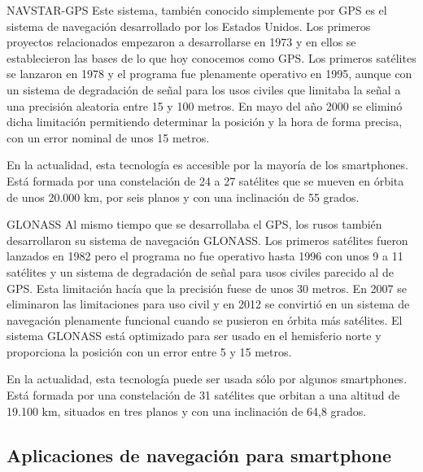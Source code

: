 \begin{definitionlist}
  \item[\acf{NAVSTAR-GPS}] Este sistema, también conocido simplemente por \acs{GPS} es el sistema
    de navegación desarrollado por los Estados Unidos. Los primeros proyectos relacionados empezaron
    a desarrollarse en 1973 y en ellos se establecieron las bases de lo que hoy conocemos como
    \acs{GPS}. Los primeros satélites se lanzaron en 1978 y el programa fue plenamente operativo en
    1995, aunque con un sistema de degradación de señal para los usos civiles que limitaba la señal
    a una precisión aleatoria entre 15 y 100 metros. En mayo del año 2000 se eliminó dicha
    limitación permitiendo determinar la posición y la hora de forma precisa, con un error nominal
    de unos 15 metros.

    En la actualidad, esta tecnología es accesible por la mayoría de los smartphones. Está formada
    por una constelación de 24 a 27 satélites que se mueven en órbita de unos 20.000 km, por seis
    planos y con una inclinación de 55 grados.

  \item[GLONASS] Al mismo tiempo que se desarrollaba el \acs{GPS}, los rusos también desarrollaron
    su sistema de navegación \acs{GLONASS}. Los primeros satélites fueron lanzados en 1982 pero el
    programa no fue operativo hasta 1996 con unos 9 a 11 satélites y un sistema de degradación de
    señal para usos civiles parecido al de \acs{GPS}. Esta limitación hacía que la precisión fuese
    de unos 30 metros. En 2007 se eliminaron las limitaciones para uso civil y en 2012 se convirtió
    en un sistema de navegación plenamente funcional cuando se pusieron en órbita más satélites. El
    sistema \acs{GLONASS} está optimizado para ser usado en el hemisferio norte y proporciona la
    posición con un error entre 5 y 15 metros.

    En la actualidad, esta tecnología puede ser usada sólo por algunos smartphones. Está formada por
    una constelación de 31 satélites que orbitan a una altitud de 19.100 km, situados en tres planos
    y con una inclinación de 64,8 grados.

\end{definitionlist}


\subsection{Aplicaciones de navegación para smartphone}

